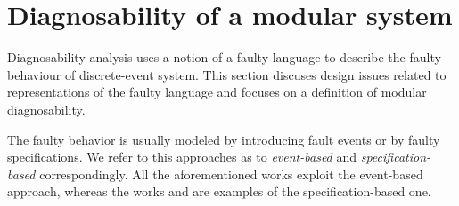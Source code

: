 \documentclass[a4paper, 10pt, conference]{ieeeconf}
\begin{document}
% 
% 

\section{Diagnosability of a modular system}
\label{sec:Diagnosability}
Diagnosability analysis uses a notion of a faulty language to describe the
faulty behaviour of discrete-event system. This section discuses design issues
related to representations of the faulty language and focuses on a definition
of modular diagnosability.

The faulty behavior is usually modeled by introducing fault events or by faulty
specifications. We refer to this approaches as to \emph{event-based} and
\emph{specification-based} correspondingly. All the aforementioned works exploit
the event-based approach, whereas the works \cite{zhou_decentralized_2008} and
\cite{sartini_methodology_2010} are examples of the specification-based one.
\end{document}
